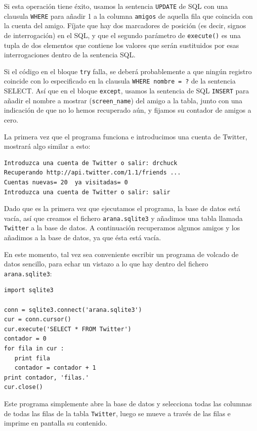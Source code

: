 Si esta operación tiene éxito, usamos la sentencia {\tt UPDATE} de SQL con una
clausula {\tt WHERE} para añadir 1 a la columna {\tt amigos} de aquella fila que
coincida con la cuenta del amigo. Fíjate que hay dos marcadores de posición (es decir,
signos de interrogación) en el SQL, y que el segundo parámetro de {\tt execute()} es
una tupla de dos elementos que contiene los valores que serán sustituidos por esas
interrogaciones dentro de la sentencia SQL.

Si el código en el bloque {\tt try} falla, se deberá probablemente a que ningún registro
coincide con lo especificado en la clausula {\tt WHERE nombre = ?} de la sentencia SELECT.
Así que en el bloque {\tt except}, usamos la sentencia de SQL {\tt INSERT} para añadir el
nombre a mostrar (\verb"screen_name") del amigo a la tabla, junto con una indicación
de que no lo hemos recuperado aún, y fijamos su contador de amigos a cero.

La primera vez que el programa funciona e introducimos una cuenta de Twitter, mostrará
algo similar a esto:

\beforeverb
\begin{verbatim}
Introduzca una cuenta de Twitter o salir: drchuck
Recuperando http://api.twitter.com/1.1/friends ...
Cuentas nuevas= 20  ya visitadas= 0
Introduzca una cuenta de Twitter o salir: salir
\end{verbatim}
\afterverb
%
Dado que es la primera vez que ejecutamos el programa, la base de datos
está vacía, así que creamos el fichero {\tt arana.sqlite3} y añadimos
una tabla llamada {\tt Twitter} a la base de datos. A continuación
recuperamos algunos amigos y los añadimos a la base de datos, ya que
ésta está vacía.

En este momento, tal vez sea conveniente escribir un programa de volcado de datos
sencillo, para echar un vistazo a lo que hay dentro del fichero {\tt arana.sqlite3}:

\beforeverb
\begin{verbatim}
import sqlite3

conn = sqlite3.connect('arana.sqlite3')
cur = conn.cursor()
cur.execute('SELECT * FROM Twitter')
contador = 0
for fila in cur :
   print fila
   contador = contador + 1
print contador, 'filas.'
cur.close()
\end{verbatim}
\afterverb
%
Este programa simplemente abre la base de datos y selecciona todas las columnas
de todas las filas de la tabla {\tt Twitter}, luego
se mueve a través de las filas e imprime en pantalla su contenido.


